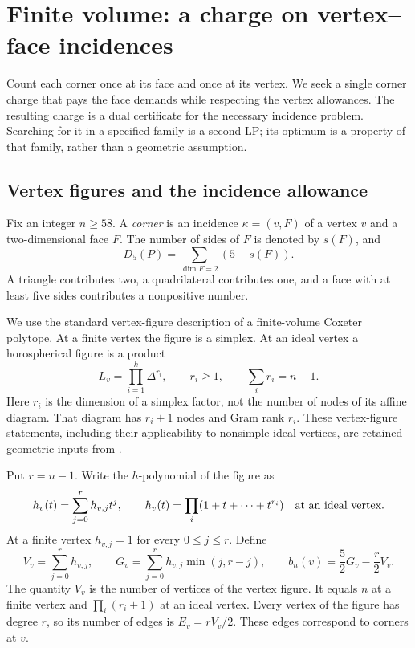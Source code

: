 \section{Finite volume: a charge on vertex--face incidences}
\label{fv:section}

Count each corner once at its face and once at its vertex. We seek a
single corner charge that pays the face demands while respecting the
vertex allowances. The resulting charge is a dual certificate for the
necessary incidence problem. Searching for it in a specified family is
a second LP; its optimum is a property of that family, rather than a
geometric assumption.

\subsection{Vertex figures and the incidence allowance}
\label{fv:incidence}

Fix an integer $n\ge58$. A \emph{corner} is an incidence
$\kappa=(v,F)$ of a vertex $v$ and a two-dimensional face $F$.
The number of sides of $F$ is denoted by $s(F)$, and
\begin{equation}\label{fv:defect}
 D_5(P)=\sum_{\dim F=2}(5-s(F)).
\end{equation}
A triangle contributes two, a quadrilateral contributes one, and a
face with at least five sides contributes a nonpositive number.

We use the standard vertex-figure description of a finite-volume
Coxeter polytope. At a finite vertex the figure is a simplex. At an
ideal vertex a horospherical figure is a product
\begin{equation}\label{fv:link}
 L_v=\prod_{i=1}^k\Delta^{r_i},\qquad
 r_i\ge1,\qquad \sum_i r_i=n-1.
\end{equation}
Here $r_i$ is the dimension of a simplex factor, not the number of
nodes of its affine diagram. That diagram has $r_i+1$ nodes and Gram
rank $r_i$. These vertex-figure statements, including their applicability
to nonsimple ideal vertices, are retained geometric inputs from
\cite{BoundsArticle,BoundsSupplement}.

Put $r=n-1$. Write the $h$-polynomial of the figure as
\begin{equation}\label{fv:hpolynomial}
 h_v(t)=\sum_{j=0}^r h_{v,j}t^j,
 \qquad
 h_v(t)=\prod_i(1+t+\cdots+t^{r_i})
 \quad\hbox{at an ideal vertex}.
\end{equation}
At a finite vertex $h_{v,j}=1$ for every $0\le j\le r$.
Define
\begin{equation}\label{fv:allowance-general}
 V_v=\sum_{j=0}^r h_{v,j},\qquad
 G_v=\sum_{j=0}^r h_{v,j}\min(j,r-j),\qquad
 b_n(v)=\frac52G_v-\frac r2V_v.
\end{equation}
The quantity $V_v$ is the number of vertices of the vertex figure.
It equals $n$ at a finite vertex and $\prod_i(r_i+1)$ at an ideal
vertex. Every vertex of the figure has degree $r$, so its number of
edges is $E_v=rV_v/2$. These edges correspond to corners at $v$.

